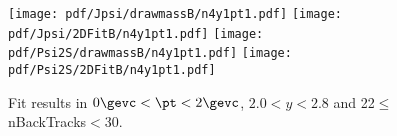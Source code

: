 \begin{figure}[H]
\begin{center}
\texttt{[image: pdf/Jpsi/drawmassB/n4y1pt1.pdf]}
\texttt{[image: pdf/Jpsi/2DFitB/n4y1pt1.pdf]}
\vspace*{-0.5cm}
\texttt{[image: pdf/Psi2S/drawmassB/n4y1pt1.pdf]}
\texttt{[image: pdf/Psi2S/2DFitB/n4y1pt1.pdf]}
\vspace*{-0.5cm}
\end{center}
\caption{Fit results in $0\gevc<\pt<2\gevc$, $2.0<y<2.8$ and 22$\leq$nBackTracks$<$30.}
\label{Fitn4y1pt1}
\end{figure}
